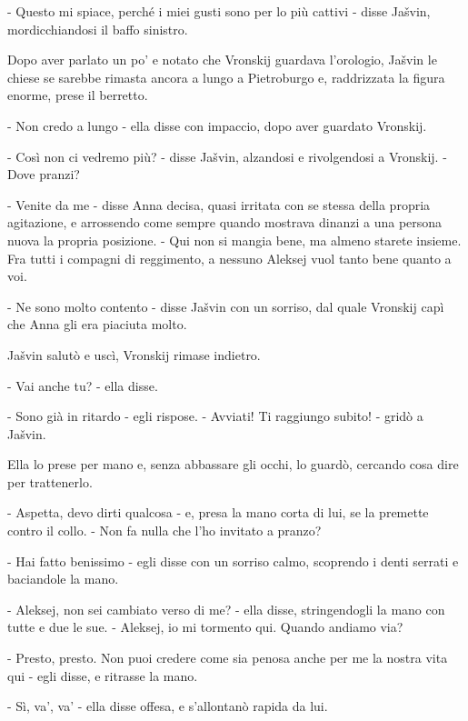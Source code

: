 - Questo mi spiace, perché i miei gusti sono per lo più cattivi - disse Jašvin, mordicchiandosi il baffo sinistro. 

Dopo aver parlato un po' e notato che Vronskij guardava l'orologio, Jašvin le chiese se sarebbe rimasta ancora a lungo a Pietroburgo e, raddrizzata la figura enorme, prese il berretto. 

- Non credo a lungo - ella disse con impaccio, dopo aver guardato Vronskij. 

- Così non ci vedremo più? - disse Jašvin, alzandosi e rivolgendosi a Vronskij. - Dove pranzi? 

- Venite da me - disse Anna decisa, quasi irritata con se stessa della propria agitazione, e arrossendo come sempre quando mostrava dinanzi a una persona nuova la propria posizione. - Qui non si mangia bene, ma almeno starete insieme. Fra tutti i compagni di reggimento, a nessuno Aleksej vuol tanto bene quanto a voi. 

- Ne sono molto contento - disse Jašvin con un sorriso, dal quale Vronskij capì che Anna gli era piaciuta molto. 

Jašvin salutò e uscì, Vronskij rimase indietro. 

- Vai anche tu? - ella disse. 

- Sono già in ritardo - egli rispose. - Avviati! Ti raggiungo subito! - gridò a Jašvin. 

Ella lo prese per mano e, senza abbassare gli occhi, lo guardò, cercando cosa dire per trattenerlo. 

- Aspetta, devo dirti qualcosa - e, presa la mano corta di lui, se la premette contro il collo. - Non fa nulla che l'ho invitato a pranzo? 

- Hai fatto benissimo - egli disse con un sorriso calmo, scoprendo i denti serrati e baciandole la mano. 

- Aleksej, non sei cambiato verso di me? - ella disse, stringendogli la mano con tutte e due le sue. - Aleksej, io mi tormento qui. Quando andiamo via? 

- Presto, presto. Non puoi credere come sia penosa anche per me la nostra vita qui - egli disse, e ritrasse la mano. 

- Sì, va', va' - ella disse offesa, e s'allontanò rapida da lui. 

